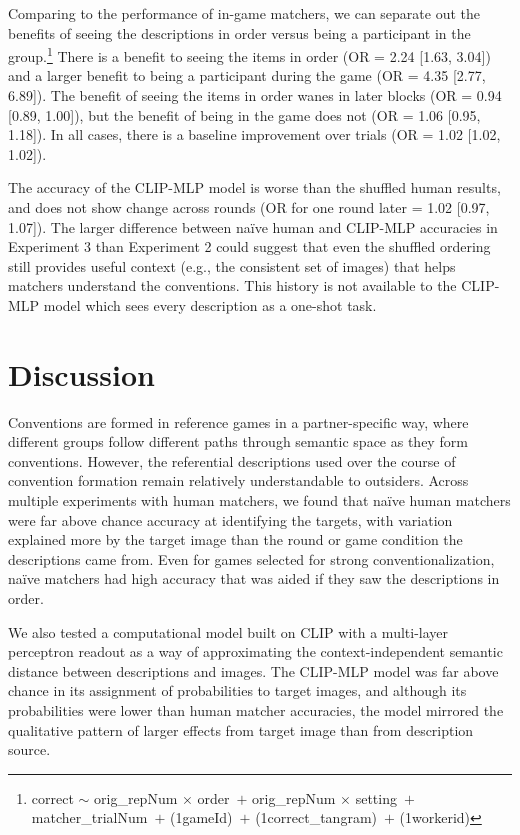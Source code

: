 \documentclass[10pt, letterpaper]{article}
\begin{document}
Comparing to the performance of in-game matchers, we can separate out
the benefits of seeing the descriptions in order versus being a
participant in the group.\footnote{correct \({\sim}\) orig\_repNum
  \({\times}\) order~\({+}\) orig\_repNum \({\times}\) setting~\({+}\)
  matcher\_trialNum~\({+}\) (1\textbar gameId)~\({+}\)
  (1\textbar correct\_tangram)~\({+}\) (1\textbar workerid)} There is a
benefit to seeing the items in order (OR = 2.24 {[}1.63, 3.04{]}) and a
larger benefit to being a participant during the game (OR = 4.35
{[}2.77, 6.89{]}). The benefit of seeing the items in order wanes in
later blocks (OR = 0.94 {[}0.89, 1.00{]}), but the benefit of being in
the game does not (OR = 1.06 {[}0.95, 1.18{]}). In all cases, there is a
baseline improvement over trials (OR = 1.02 {[}1.02, 1.02{]}).

The accuracy of the CLIP-MLP model is worse than the shuffled human
results, and does not show change across rounds (OR for one round later
= 1.02 {[}0.97, 1.07{]}). The larger difference between naïve human and
CLIP-MLP accuracies in Experiment 3 than Experiment 2 could suggest that
even the shuffled ordering still provides useful context (e.g., the
consistent set of images) that helps matchers understand the
conventions. This history is not available to the CLIP-MLP model which
sees every description as a one-shot task.

\section{Discussion}\label{discussion}

Conventions are formed in reference games in a partner-specific way,
where different groups follow different paths through semantic space as
they form conventions. However, the referential descriptions used over
the course of convention formation remain relatively understandable to
outsiders. Across multiple experiments with human matchers, we found
that naïve human matchers were far above chance accuracy at identifying
the targets, with variation explained more by the target image than the
round or game condition the descriptions came from. Even for games
selected for strong conventionalization, naïve matchers had high
accuracy that was aided if they saw the descriptions in order.

We also tested a computational model built on CLIP with a multi-layer
perceptron readout as a way of approximating the context-independent
semantic distance between descriptions and images. The CLIP-MLP model
was far above chance in its assignment of probabilities to target
images, and although its probabilities were lower than human matcher
accuracies, the model mirrored the qualitative pattern of larger effects
from target image than from description source.
\end{document}
